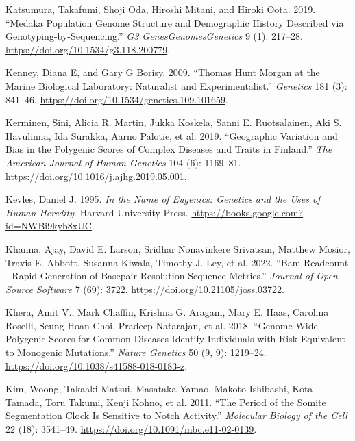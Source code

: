 \documentclass[
]{book}
\newlength{\cslhangindent}
\newlength{\cslentryspacingunit} %
\newenvironment{CSLReferences}[2] %
 {%
  \setlength{\parindent}{0pt}
  \ifodd #1
  \let\oldpar\par
  \def\par{\hangindent=\cslhangindent\oldpar}
  \fi
  \setlength{\parskip}{#2\cslentryspacingunit}
 }%
 {}
\begin{document}
\begin{CSLReferences}{1}{0}
\leavevmode{}%
Katsumura, Takafumi, Shoji Oda, Hiroshi Mitani, and Hiroki Oota. 2019. {``Medaka {Population Genome Structure} and {Demographic History Described} via {Genotyping-by-Sequencing}.''} \emph{G3 Genes\textbar Genomes\textbar Genetics} 9 (1): 217--28. \url{https://doi.org/10.1534/g3.118.200779}.

\leavevmode{}%
Kenney, Diana E, and Gary G Borisy. 2009. {``Thomas {Hunt Morgan} at the {Marine Biological Laboratory}: {Naturalist} and {Experimentalist}.''} \emph{Genetics} 181 (3): 841--46. \url{https://doi.org/10.1534/genetics.109.101659}.

\leavevmode{}%
Kerminen, Sini, Alicia R. Martin, Jukka Koskela, Sanni E. Ruotsalainen, Aki S. Havulinna, Ida Surakka, Aarno Palotie, et al. 2019. {``Geographic {Variation} and {Bias} in the {Polygenic Scores} of {Complex Diseases} and {Traits} in {Finland}.''} \emph{The American Journal of Human Genetics} 104 (6): 1169--81. \url{https://doi.org/10.1016/j.ajhg.2019.05.001}.

\leavevmode{}%
Kevles, Daniel J. 1995. \emph{In the {Name} of {Eugenics}: {Genetics} and the {Uses} of {Human Heredity}}. {Harvard University Press}. \url{https://books.google.com?id=NWBi9kyb8xUC}.

\leavevmode{}%
Khanna, Ajay, David E. Larson, Sridhar Nonavinkere Srivatsan, Matthew Mosior, Travis E. Abbott, Susanna Kiwala, Timothy J. Ley, et al. 2022. {``Bam-Readcount - Rapid Generation of Basepair-Resolution Sequence Metrics.''} \emph{Journal of Open Source Software} 7 (69): 3722. \url{https://doi.org/10.21105/joss.03722}.

\leavevmode{}%
Khera, Amit V., Mark Chaffin, Krishna G. Aragam, Mary E. Haas, Carolina Roselli, Seung Hoan Choi, Pradeep Natarajan, et al. 2018. {``Genome-Wide Polygenic Scores for Common Diseases Identify Individuals with Risk Equivalent to Monogenic Mutations.''} \emph{Nature Genetics} 50 (9, 9): 1219--24. \url{https://doi.org/10.1038/s41588-018-0183-z}.

\leavevmode{}%
Kim, Woong, Takaaki Matsui, Masataka Yamao, Makoto Ishibashi, Kota Tamada, Toru Takumi, Kenji Kohno, et al. 2011. {``The Period of the Somite Segmentation Clock Is Sensitive to {Notch} Activity.''} \emph{Molecular Biology of the Cell} 22 (18): 3541--49. \url{https://doi.org/10.1091/mbc.e11-02-0139}.


\end{CSLReferences}
\end{document}
